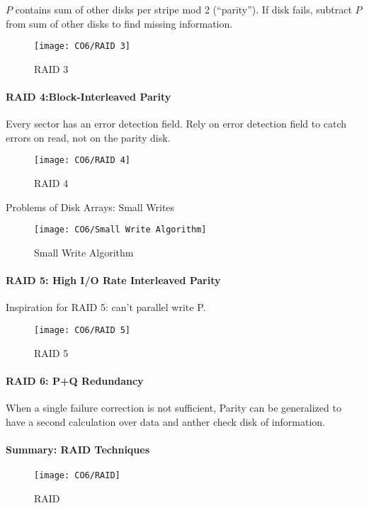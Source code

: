 $P$ contains sum of other disks per stripe mod 2 (``parity'').  If disk fails, subtract $P$ from sum of other disks to find missing information. 

\begin{figure}[!htb]
    \centering
    \texttt{[image: CO6/RAID 3]}
    \caption{RAID 3}
\end{figure}


\paragraph{RAID 4:Block-Interleaved Parity}
Every sector has an error detection field. Rely on error detection field to catch errors on read, not on the parity disk. 

\begin{figure}[!htb]
    \centering
    \texttt{[image: CO6/RAID 4]}
    \caption{RAID 4}
\end{figure}

Problems of Disk Arrays: Small Writes
\begin{figure}[!htb]
    \centering
    \texttt{[image: CO6/Small Write Algorithm]}
    \caption{Small Write Algorithm}
\end{figure}

\paragraph{RAID 5: High I/O Rate Interleaved Parity}
Inspiration for RAID 5: can't parallel write P. 

\begin{figure}[!htb]
    \centering
    \texttt{[image: CO6/RAID 5]}
    \caption{RAID 5}
\end{figure}

\paragraph{RAID 6: P+Q Redundancy}
When a single failure correction is not sufficient, Parity can be generalized to have a second calculation over data and anther check disk of information.

\paragraph{Summary: RAID Techniques}

\begin{figure}[!htb]
    \centering
    \texttt{[image: CO6/RAID]}
    \caption{RAID}
\end{figure}

